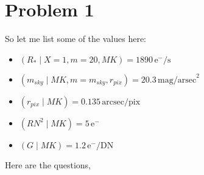\documentclass[12pt,letterpaper]{article}
\begin{document}
\section*{Problem 1}

So let me list some of the values here:
\begin{itemize}
    \item $ (R_* \mid X= 1 , m=20, MK
         ) = 1890 \, \mathrm{e^- / s}$
    
    \item $ (m_{sky} \mid MK, m = m_{sky}, r_{pix}) = 20.3 \, 
    \mathrm{mag/arsec}^2 $
    
    \item $ (r_{pix} \mid MK) = 0.135 \, 
    \mathrm{arcsec/pix} $

    \item $ (RN^2 \mid MK) = 5 \, \mathrm{e^-}$
    \item $ (G \mid MK) = 1.2 \, \mathrm{e^-/DN}$
\end{itemize}

Here are the questions,
\end{document}
